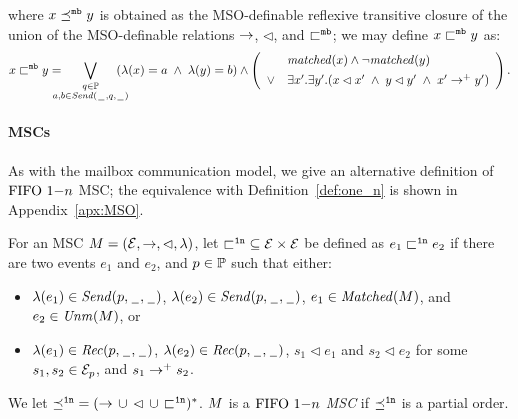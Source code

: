 where $x \mbpartial y$ is obtained as the MSO-definable reflexive transitive closure of
the union of the MSO-definable relations $\procrel$, $\lhd$, and $\mbrel$; 
we may define $x \mbrel y$ as:
\[
x \mbrel y =
\displaystyle
\hspace{-1em}\bigvee_{\substack{q \in \Procs\\a,b \in \qsAct{q}}}\hspace{-1em}
(\lambda(x) = a \;\wedge\; \lambda(y) = b)
\wedge
\left(
\begin{array}{rl}
& \mathit{matched}(x) \wedge \neg \mathit{matched}(y)\\[1ex]
\vee & \exists x'.\exists y'. (x \lhd x' \;\wedge\; y \lhd y' \;\wedge\; x' \procrel^+ y')
\end{array}
\right).
\]



\paragraph{\bf \onen MSCs}

As with the mailbox communication model, we give an alternative definition of $\onen$ MSC; the equivalence with Definition~\ref{def:one_n} is shown in Appendix~\ref{apx:MSO}.

\begin{definition} \label{def:one_n_alt}
	For an MSC $\msc = (\Events,\procrel,\lhd,\lambda)$, let ${\onenrel} \subseteq \Events \times \Events$ be defined as $e_1 \onenrel e_2$ if there are two events $e_1$ and $e_2$, and $p \in \Procs$ such that either:
	\begin{itemize}%
		\item $\lambda(e_1) \in \psAct{p}$, $\lambda(e_2) \in \psAct{p}$, $e_1 \in \Matched{\msc}$, and $e_2 \in \Unm{\msc}$, or
		\item $\lambda(e_1) \in \prAct{p}$, $\lambda(e_2) \in \prAct{p}$, $s_1 \lhd e_1$ and $s_2 \lhd e_2$ for some $s_1,s_2 \in \Events_p$, and $s_1 \procrel^+ s_2$.
	\end{itemize}

	We let ${\onenpartial} = ({\procrel} \,\cup\, {\lhd} \,\cup\, {\onenrel})^\ast$.
	$\msc$ is a \emph{$\onen$ MSC}
	if ${\onenpartial}$ is a partial order.
\end{definition}

